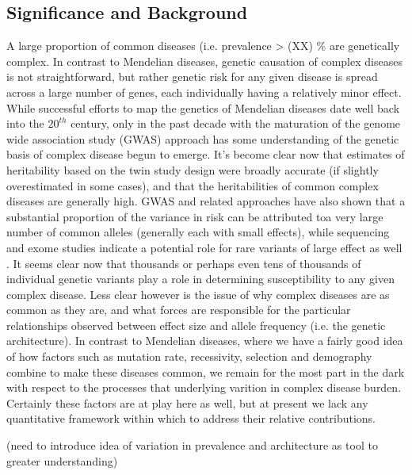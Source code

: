 \documentclass[11pt]{article}
\newcommand{\jb}[1]{{\color{blue} (#1)} }
\begin{document}
\subsection*{Significance and Background}

A large proportion of common diseases (i.e. prevalence > \jb{XX}\% are genetically complex. In contrast to Mendelian diseases, genetic causation of complex diseases is not straightforward, but rather genetic risk for any given disease is spread across a large number of genes, each individually having a relatively minor effect. While successful efforts to map the genetics of Mendelian diseases date well back into the $20^{th}$ century, only in the past decade with the maturation of the genome wide association study (GWAS) approach has some understanding of the genetic basis of complex disease begun to emerge\cite{Visscher:2012je,get_more}. It's become clear now that estimates of heritability based on the twin study design were broadly accurate (if slightly overestimated in some cases), and that the heritabilities of common complex diseases are generally high. GWAS and related approaches have also shown that a substantial proportion of the variance in risk can be attributed toa very large number of common alleles (generally each with small effects)\cite{Consortium:2009ef, Lee:2012iu,Loh:2015hz, Ripke:2014eb}, while sequencing and exome studies indicate a potential role for rare variants of large effect as well \cite{Richards:2016cs, Genovese:2016fv, Purcell:2014gw}. It seems clear now that thousands or perhaps even tens of thousands of individual genetic variants play a role in determining susceptibility to any given complex disease. Less clear however is the issue of why complex diseases are as common as they are, and what forces are responsible for the particular relationships observed between effect size and allele frequency (i.e. the genetic architecture). In contrast to Mendelian diseases, where we have a fairly good idea of how factors such as mutation rate, recessivity, selection \cite{Patil:2010ha} and demography \cite{HurlesText} combine to make these diseases common, we remain for the most part in the dark with respect to the processes that underlying varition in complex disease burden. Certainly these factors are at play here as well, but at present we lack any quantitative framework within which to address their relative contributions.

\jb{need to introduce idea of variation in prevalence and architecture as tool to greater understanding}
\end{document}
